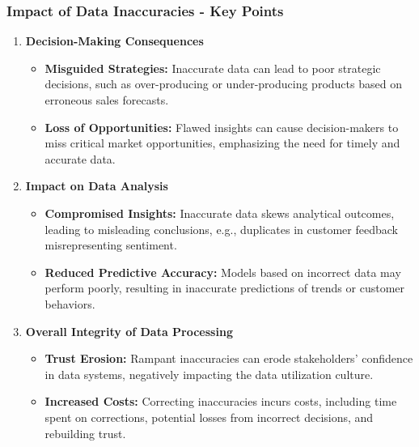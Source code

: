 \documentclass{beamer}
\begin{document}
\begin{frame}[fragile]
    \frametitle{Impact of Data Inaccuracies - Key Points}
    \begin{enumerate}
        \item \textbf{Decision-Making Consequences}
            \begin{itemize}
                \item \textbf{Misguided Strategies:} Inaccurate data can lead to poor strategic decisions, such as over-producing or under-producing products based on erroneous sales forecasts.
                \item \textbf{Loss of Opportunities:} Flawed insights can cause decision-makers to miss critical market opportunities, emphasizing the need for timely and accurate data.
            \end{itemize}
        
        \item \textbf{Impact on Data Analysis}
            \begin{itemize}
                \item \textbf{Compromised Insights:} Inaccurate data skews analytical outcomes, leading to misleading conclusions, e.g., duplicates in customer feedback misrepresenting sentiment.
                \item \textbf{Reduced Predictive Accuracy:} Models based on incorrect data may perform poorly, resulting in inaccurate predictions of trends or customer behaviors.
            \end{itemize}
        
        \item \textbf{Overall Integrity of Data Processing}
            \begin{itemize}
                \item \textbf{Trust Erosion:} Rampant inaccuracies can erode stakeholders’ confidence in data systems, negatively impacting the data utilization culture.
                \item \textbf{Increased Costs:} Correcting inaccuracies incurs costs, including time spent on corrections, potential losses from incorrect decisions, and rebuilding trust.
            \end{itemize}
    \end{enumerate}
\end{frame}
\end{document}

